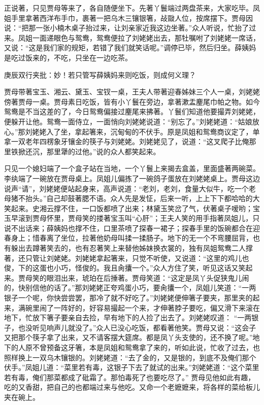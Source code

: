 \begin{parag}
    正说著，只见贾母等来了，各自随便坐下。先著丫鬟端过两盘茶来，大家吃毕。凤姐手里拿著西洋布手巾，裹著一把乌木三镶银箸，敁敠人位，按席摆下。贾母因说：“把那一张小楠木桌子抬过来，让刘亲家近我这边坐著。”众人听说，忙抬了过来。凤姐一面递眼色与鸳鸯，鸳鸯便拉了刘姥姥出去，那牡嘱咐了刘姥姥一席话，又说：“这是我们家的规矩，若错了我们就笑话呢。”调停已毕，然后归坐。薛姨妈是吃过饭来的，不吃，只坐在一边吃茶。\begin{note}庚辰双行夹批：妙！若只管写薛姨妈来则吃饭，则成何义理？\end{note}贾母带著宝玉、湘云、黛玉、宝钗一桌，王夫人带著迎春姊妹三个人一桌，刘姥姥傍著贾母一桌。贾母素日吃饭，皆有小丫鬟在旁边，拿著漱盂麈尾巾帕之物。如今鸳鸯是不当这差的了，今日鸳鸯偏接过麈尾来拂著。丫鬟们知道他要撮弄刘姥姥，便躲开让他。鸳鸯一面侍立，一面悄向刘姥姥说道：“别忘了。”刘姥姥道：“姑娘放心。”那刘姥姥入了坐，拿起箸来，沉甸甸的不伏手。原是凤姐和鸳鸯商议定了，单拿一双老年四楞象牙镶金的筷子与刘姥姥。刘姥姥见了，说道：“这叉爬子比俺那里铁掀还沉，那里犟的过他。”说的众人都笑起来。
\end{parag}


\begin{parag}
    只见一个媳妇端了一个盒子站在当地，一个丫鬟上来揭去盒盖，里面盛著两碗菜。李纨端了一碗放在贾母桌上。凤姐儿偏拣了一碗鸽子蛋放在刘姥姥桌上。贾母这边说声“请”，刘姥姥便站起身来，高声说道：“老刘，老刘，食量大似牛，吃一个老母猪不抬头。”自己却鼓著腮不语。众人先是发怔，后来一听，上上下下都哈哈的大笑起来。史湘云撑不住，一口饭都喷了出来；林黛玉笑岔了气，伏著桌子嗳哟；宝玉早滚到贾母怀里，贾母笑的搂著宝玉叫“心肝”；王夫人笑的用手指著凤姐儿，只说不出话来；薛姨妈也撑不住，口里茶喷了探春一裙子；探春手里的饭碗都合在迎春身上；惜春离了坐位，拉著他奶母叫揉一揉肠子。地下的无一个不弯腰屈背，也有躲出去蹲著笑去的，也有忍著笑上来替他姊妹换衣裳的，独有凤姐鸳鸯二人撑著，还只管让刘姥姥。刘姥姥拿起箸来，只觉不听使，又说道：“这里的鸡儿也俊，下的这蛋也小巧，怪俊的。我且肏攮一个。”众人方住了笑，听见这话又笑起来。贾母笑的眼泪出来，琥珀在后捶著。贾母笑道：“这定是凤丫头促狭鬼儿闹的，快别信他的话了。”那刘姥姥正夸鸡蛋小巧，要肏攮一个，凤姐儿笑道：“一两银子一个呢，你快尝尝罢，那冷了就不好吃了。”刘姥姥便伸箸子要夹，那里夹的起来，满碗里闹了一阵好的，好容易撮起一个来，才伸著脖子要吃，偏又滑下来滚在地下，忙放下箸子要亲自去捡，早有地下的人捡了出去了。刘姥姥叹道： “一两银子，也没听见响声儿就没了。”众人已没心吃饭，都看著他笑。贾母又说：“这会子又把那个筷子拿了出来，又不请客摆大筵席。都是凤丫头支使的，还不换了呢。”地下的人原不曾预备这牙箸，本是凤姐和鸳鸯拿了来的，听如此说，忙收了过去，也照样换上一双乌木镶银的。刘姥姥道：“去了金的，又是银的，到底不及俺们那个伏手。”凤姐儿道：“菜里若有毒，这银子下去了就试的出来。”刘姥姥道：“这个菜里若有毒，俺们那菜都成了砒霜了。那怕毒死了也要吃尽了。” 贾母见他如此有趣，吃的又香甜，把自己的也都端过来与他吃。又命一个老嬷嬷来，将各样的菜给板儿夹在碗上。
\end{parag}


